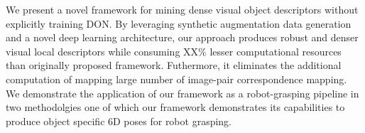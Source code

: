 We present a novel framework for mining dense visual object descriptors without explicitly training DON.
By leveraging synthetic augmentation data generation and a novel deep learning architecture, our approach produces robust
and denser visual local descriptors
while consuming XX\% lesser computational resources than originally proposed framework.
Futhermore, it eliminates the additional computation of mapping large number of image-pair correspondence mapping.
We demonstrate the application of our framework as a robot-grasping pipeline in two methodolgies one of which our
framework demonstrates its capabilities to produce object specific 6D poses for robot grasping.